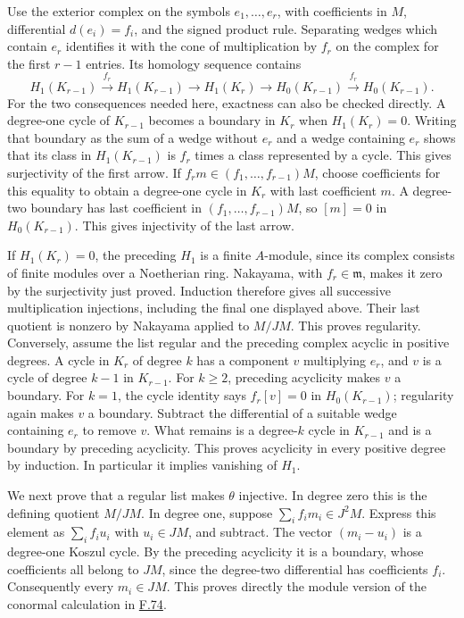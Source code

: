 \documentclass[11pt,a4paper,openany]{report}
\begin{document}
Use the exterior complex on the symbols \(e_1,\ldots,e_r\), with coefficients in \(M\), differential \(d(e_i)=f_i\), and the signed product rule. Separating wedges which contain \(e_r\) identifies it with the cone of multiplication by \(f_r\) on the complex for the first \(r-1\) entries. Its homology sequence contains \[H_1(K_{r-1})\xrightarrow{f_r}H_1(K_{r-1})\longrightarrow H_1(K_r)\longrightarrow H_0(K_{r-1})\xrightarrow{f_r}H_0(K_{r-1}).\] For the two consequences needed here, exactness can also be checked directly. A degree-one cycle of \(K_{r-1}\) becomes a boundary in \(K_r\) when \(H_1(K_r)=0\). Writing that boundary as the sum of a wedge without \(e_r\) and a wedge containing \(e_r\) shows that its class in \(H_1(K_{r-1})\) is \(f_r\) times a class represented by a cycle. This gives surjectivity of the first arrow. If \(f_rm\in(f_1,\ldots,f_{r-1})M\), choose coefficients for this equality to obtain a degree-one cycle in \(K_r\) with last coefficient \(m\). A degree-two boundary has last coefficient in \((f_1,\ldots,f_{r-1})M\), so \([m]=0\) in \(H_0(K_{r-1})\). This gives injectivity of the last arrow.

If \(H_1(K_r)=0\), the preceding \(H_1\) is a finite \(A\)-module, since its complex consists of finite modules over a Noetherian ring. Nakayama, with \(f_r\in\mathfrak m\), makes it zero by the surjectivity just proved. Induction therefore gives all successive multiplication injections, including the final one displayed above. Their last quotient is nonzero by Nakayama applied to \(M/JM\). This proves regularity. Conversely, assume the list regular and the preceding complex acyclic in positive degrees. A cycle in \(K_r\) of degree \(k\) has a component \(v\) multiplying \(e_r\), and \(v\) is a cycle of degree \(k-1\) in \(K_{r-1}\). For \(k\geq2\), preceding acyclicity makes \(v\) a boundary. For \(k=1\), the cycle identity says \(f_r[v]=0\) in \(H_0(K_{r-1})\); regularity again makes \(v\) a boundary. Subtract the differential of a suitable wedge containing \(e_r\) to remove \(v\). What remains is a degree-\(k\) cycle in \(K_{r-1}\) and is a boundary by preceding acyclicity. This proves acyclicity in every positive degree by induction. In particular it implies vanishing of \(H_1\).

We next prove that a regular list makes \(\theta\) injective. In degree zero this is the defining quotient \(M/JM\). In degree one, suppose \(\sum_i f_im_i\in J^2M\). Express this element as \(\sum_i f_iu_i\) with \(u_i\in JM\), and subtract. The vector \((m_i-u_i)\) is a degree-one Koszul cycle. By the preceding acyclicity it is a boundary, whose coefficients all belong to \(JM\), since the degree-two differential has coefficients \(f_i\). Consequently every \(m_i\in JM\). This proves directly the module version of the conormal calculation in \hyperref[AG-RG-S05-algebra-lemma-regular-quasi-regular]{F.74}.
\end{document}
